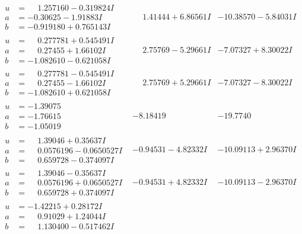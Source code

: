 \documentclass[1p]{elsarticle_modified}
\theoremstyle{definition}
\begin{document}
$$\begin{array}{c|c|c}
\begin{aligned}
u &= \phantom{-}1.257160 - 0.319824 I \\
a &= -0.30625 - 1.91883 I \\
b &= -0.919180 + 0.765143 I\end{aligned}
 & \phantom{-}1.41444 + 6.86561 I & -10.38570 - 5.84031 I \\ \hline\begin{aligned}
u &= \phantom{-}0.277781 + 0.545491 I \\
a &= \phantom{-}0.27455 + 1.66102 I \\
b &= -1.082610 - 0.621058 I\end{aligned}
 & \phantom{-}2.75769 - 5.29661 I & -7.07327 + 8.30022 I \\ \hline\begin{aligned}
u &= \phantom{-}0.277781 - 0.545491 I \\
a &= \phantom{-}0.27455 - 1.66102 I \\
b &= -1.082610 + 0.621058 I\end{aligned}
 & \phantom{-}2.75769 + 5.29661 I & -7.07327 - 8.30022 I \\ \hline\begin{aligned}
u &= -1.39075\phantom{ +0.000000I} \\
a &= -1.76615\phantom{ +0.000000I} \\
b &= -1.05019\phantom{ +0.000000I}\end{aligned}
 & -8.18419\phantom{ +0.000000I} & -19.7740\phantom{ +0.000000I} \\ \hline\begin{aligned}
u &= \phantom{-}1.39046 + 0.35637 I \\
a &= \phantom{-}0.0576196 - 0.0650527 I \\
b &= \phantom{-}0.659728 - 0.374097 I\end{aligned}
 & -0.94531 - 4.82332 I & -10.09113 + 2.96370 I \\ \hline\begin{aligned}
u &= \phantom{-}1.39046 - 0.35637 I \\
a &= \phantom{-}0.0576196 + 0.0650527 I \\
b &= \phantom{-}0.659728 + 0.374097 I\end{aligned}
 & -0.94531 + 4.82332 I & -10.09113 - 2.96370 I \\ \hline\begin{aligned}
u &= -1.42215 + 0.28172 I \\
a &= \phantom{-}0.91029 + 1.24044 I \\
b &= \phantom{-}1.130400 - 0.517462 I\end{aligned}

\end{array}$$
\end{document}
